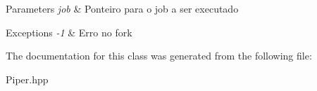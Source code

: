 \begin{DoxyParams}{Parameters}
{\em job} & Ponteiro para o job a ser executado \\
\hline
\end{DoxyParams}

\begin{DoxyExceptions}{Exceptions}
{\em -\/1} & Erro no fork \\
\hline
\end{DoxyExceptions}


The documentation for this class was generated from the following file:\begin{DoxyCompactItemize}
\item 
Piper.hpp\end{DoxyCompactItemize}
